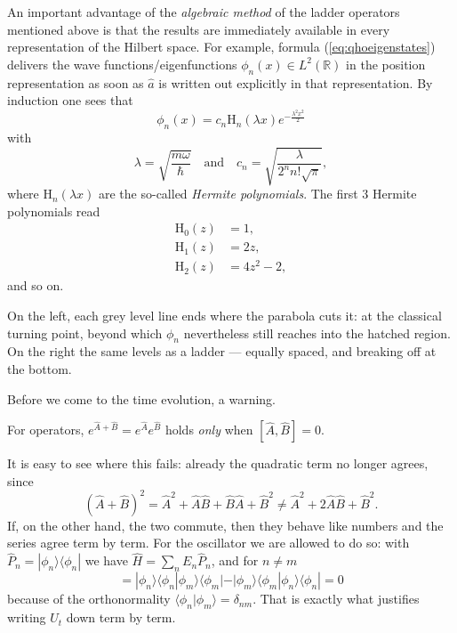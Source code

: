 An important advantage of the \emph{algebraic method} of the ladder operators mentioned above is
that the results are immediately available in every representation of the Hilbert space. For example, formula (\ref{eq:qhoeigenstates}) delivers the wave functions/eigenfunctions $\phi_n(x) \in L^2(\mathbb{R})$ in the position representation as soon as $\widehat{a}$ is written out explicitly in that representation. By induction one sees that 
\begin{equation}
	\phi_n(x) = c_n \mathrm{H}_n(\lambda x)  e^{-\frac{\lambda^2 x^2}{2}}
\end{equation}
with
\begin{equation}
	\lambda = \sqrt{\frac{m\omega}{\hbar}}\quad \text{and} \quad c_n = \sqrt{\frac{\lambda}{2^n n!\sqrt{\pi}}},
\end{equation}
where
$\mathrm{H}_n(\lambda x)$ are the so-called \emph{Hermite polynomials}. The first $3$ Hermite polynomials
read
\begin{align}
	\mathrm{H}_0(z) &= 1,\\
	\mathrm{H}_1(z) &= 2z,\\
	\mathrm{H}_2(z) &= 4z^2-2,
\end{align}
and so on.



On the left, each grey level line ends where the parabola cuts it: at the
classical turning point, beyond which $\phi_n$ nevertheless still reaches into
the hatched region. On the right the same levels as a ladder ---
equally spaced, and breaking off at the bottom.

Before we come to the time evolution, a warning.

\begin{merksatz}
For operators, $e^{\widehat{A}+\widehat{B}} = e^{\widehat{A}}e^{\widehat{B}}$ holds \emph{only} when $[\widehat{A},\widehat{B}] = 0$.
\end{merksatz}

It is easy to see where this fails: already the quadratic term no longer agrees, since
\begin{equation}
	(\widehat{A}+\widehat{B})^2 = \widehat{A}^2 + \widehat{A}\widehat{B} + \widehat{B}\widehat{A} + \widehat{B}^2
	\neq \widehat{A}^2 + 2\widehat{A}\widehat{B} + \widehat{B}^2.
\end{equation}
If, on the other hand, the two commute, then they behave like numbers and the series agree term by term. For the oscillator we are allowed to do so: with $\widehat{P}_n = |\phi_n\rangle\langle\phi_n|$ we have $\widehat{H} = \sum_n E_n\widehat{P}_n$, and for $n \neq m$
\begin{equation}
	[\widehat{P}_n,\widehat{P}_m] = |\phi_n\rangle\langle\phi_n|\phi_m\rangle\langle\phi_m|
	- |\phi_m\rangle\langle\phi_m|\phi_n\rangle\langle\phi_n| = 0
\end{equation}
because of the orthonormality $\langle\phi_n|\phi_m\rangle = \delta_{nm}$. That is exactly what justifies writing $U_t$ down term by term.

